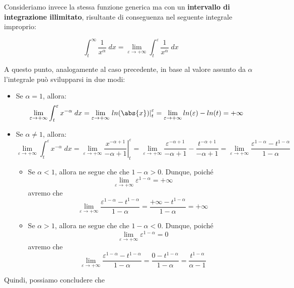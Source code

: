 \documentclass[a4paper, 12pt]{report}
\begin{document}
    Consideriamo invece la stessa funzione generica ma con un \textbf{intervallo di integrazione illimitato}, risultante di conseguenza nel seguente integrale improprio:
    
    \[ \int_{t}^{\infty} \frac{1}{x^{\alpha}} \; dx = \lim_{\varepsilon \to +\infty}  \int_{t}^{\varepsilon} \frac{1}{x^{\alpha}} \; dx\]
    
    A questo punto, analogamente al caso precedente, in base al valore assunto da $\alpha$ l'integrale può svilupparsi in due modi:
    
        \begin{itemize}
        \item Se $\alpha = 1$, allora:
        \[\lim_{\varepsilon \to +\infty} \int_{t}^{\varepsilon} x^{-\alpha} \; dx =
        \lim_{\varepsilon \to +\infty} \left . ln(\abs{x}) \right |_{t}^{\varepsilon} = \lim_{\varepsilon \to +\infty} ln(\varepsilon) - ln(t) = +\infty\]
        
        \item Se $\alpha \neq 1$, allora:
        \[\lim_{\varepsilon \to +\infty} \int_{t}^{\varepsilon} x^{-\alpha} \; dx =
        \lim_{\varepsilon \to +\infty} \left . \frac{x^{-\alpha+1}}{-\alpha+1} \right |_{t}^{\varepsilon} = \lim_{\varepsilon \to +\infty}  \frac{\varepsilon^{-\alpha+1}}{-\alpha+1} - \frac{t^{-\alpha+1}}{-\alpha+1} = \lim_{\varepsilon \to +\infty} \frac{\varepsilon^{1-\alpha}- t^{1-\alpha}}{1-\alpha} \]
        
        \begin{itemize}
            \item Se $\alpha < 1$, allora ne segue che che $1-\alpha > 0$. Dunque, poiché
            \[ \lim_{\varepsilon \to +\infty} \varepsilon^{1-\alpha} = +\infty\]
            avremo che
            \[\lim_{\varepsilon \to +\infty} \frac{\varepsilon^{1-\alpha}-t^{1-\alpha}}{1-\alpha} = \frac{+\infty-t^{1-\alpha}}{1-\alpha} = +\infty\]
            
            \item Se $\alpha > 1$, allora ne segue che che $1-\alpha < 0$. Dunque, poiché
            \[ \lim_{\varepsilon \to +\infty} \varepsilon^{1-\alpha} = 0\]
            avremo che
            \[\lim_{\varepsilon \to +\infty} \frac{\varepsilon^{1-\alpha}-t^{1-\alpha}}{1-\alpha} = \frac{0-t^{1-\alpha}}{1-\alpha} = \frac{t^{1-\alpha}}{\alpha-1}\]
        \end{itemize}
    \end{itemize}
    
    
    Quindi, possiamo concludere che 
    
\end{document}
